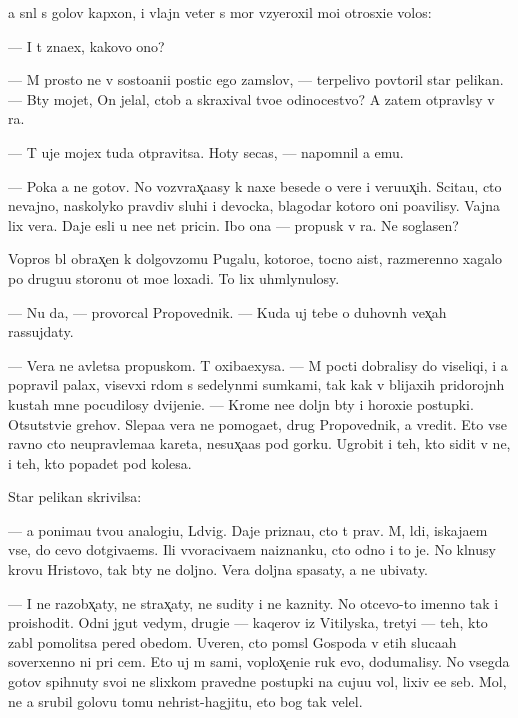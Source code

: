 \documentclass[10pt]{book}
\begin{document}
{\Y}a sn{\ia}l s golov{\yi} kap{\iu}xon, i vlajn{\yi}{\y} veter s mor{\ia} vzyeroxil mo{\y}i otrosxi{\y}e volos{\yi}:

— I t{\yi} zna{\y}ex, kakovo ono?

— M{\yi} prosto ne v sosto{\y}ani{\y}i postic {\Y}ego zam{\yi}slov, — terpelivo povtoril star{\yi}{\y} pelikan. — B{\yi}ty mojet, On jelal, ctob{\yi} {\y}a skraxival tvo{\y}e odinocestvo? A zatem otpravl{\iu}sy v ra{\y}.

— T{\yi} uje mojex tuda otpravitsa. Hoty se{\y}cas, — napomnil {\y}a {\y}emu.

— Poka {\y}a ne gotov. No vozvrax̨a{\y}asy k naxe{\y} besede o vere i veru{\y}ux̨ih. Scita{\y}u, cto nevajno, naskolyko pravdiv{\yi} sluhi i devocka, blagodar{\ia} kotoro{\y} oni po{\y}avilisy. Vajna lix vera. Daje {\y}esli u ne{\y}e net pricin{\yi}. Ibo ona — propusk v ra{\y}. Ne soglasen?

Vopros b{\yi}l obrax̨en k dolgov{\ia}zomu Pugalu, kotoro{\y}e, tocno a{\y}ist, razmerenno xagalo po drugu{\y}u storonu ot mo{\y}e{\y} loxadi. To lix uhm{\yi}lynulosy.

— Nu da, — provorcal Propovednik. — Kuda uj tebe o duhovn{\yi}h vex̨ah rassujdaty.

— Vera ne {\y}avl{\ia}{\y}etsa propuskom. T{\yi} oxiba{\y}exysa. — M{\yi} pocti dobralisy do viseliqi, i {\y}a popravil palax, visevxi{\y} r{\ia}dom s sedelyn{\yi}mi sumkami, tak kak v blija{\y}xih pridorojn{\yi}h kustah mne pocudilosy dvijeni{\y}e. — Krome ne{\y}e doljn{\yi} b{\yi}ty i horoxi{\y}e postupki. Otsutstvi{\y}e grehov. Slepa{\y}a vera ne pomoga{\y}et, drug Propovednik, a vredit. Eto vse ravno cto neupravl{\ia}{\y}ema{\y}a kareta, nesux̨a{\y}as{\ia} pod gorku. Ugrobit i teh, kto sidit v ne{\y}, i teh, kto popadet pod kolesa.

Star{\yi}{\y} pelikan skrivilsa:

— {\Y}a ponima{\y}u tvo{\y}u analogi{\y}u, L{\iu}dvig. Daje prizna{\y}u, cto t{\yi} prav. M{\yi}, l{\iu}di, iskaja{\y}em vse, do cevo dot{\ia}giva{\y}ems{\ia}. Ili v{\yi}voraciva{\y}em na{\y}iznanku, cto odno i to je. No kl{\ia}nusy krov{\y}u Hristovo{\y}, tak b{\yi}ty ne doljno. Vera doljna spasaty, a ne ubivaty.

— I ne razobx̨aty, ne strax̨aty, ne sudity i ne kaznity. No otcevo-to imenno tak i pro{\y}ishodit. Odni jgut vedym, drugi{\y}e — kaqerov iz Vitilyska, tretyi — teh, kto zab{\yi}l pomolitsa pered obedom. Uveren, cto pom{\yi}sl{\yi} Gospoda v etih sluca{\y}ah soverxenno ni pri cem. Eto uj m{\yi} sami, voplox̨eni{\y}e ruk {\y}evo, dodumalisy. No vsegda gotov{\yi} spihnuty svo{\y}i ne slixkom pravedn{\yi}{\y}e postupki na cuju{\y}u vol{\iu}, lixiv {\y}e{\y}e seb{\ia}. Mol, ne {\y}a srubil golovu tomu nehrist{\iu}-hagjitu, eto bog tak velel.
\end{document}
